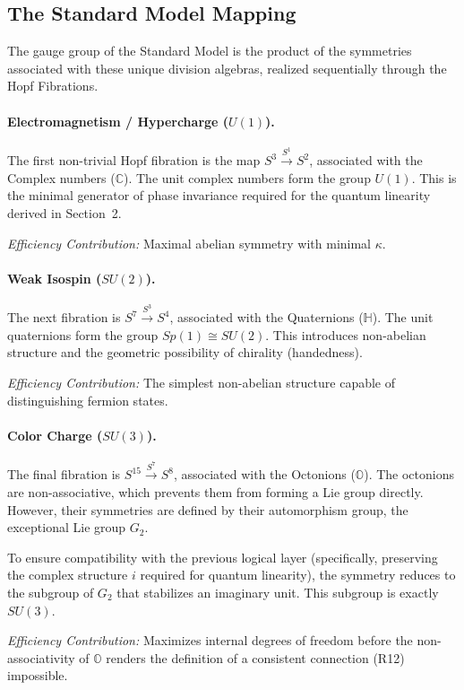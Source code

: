 \documentclass[12pt,a4paper]{article}
\theoremstyle{definition}
\newcommand{\C}{\mathbb{C}}
\newcommand{\HH}{\mathbb{H}}
\newcommand{\OO}{\mathbb{O}}
\newcommand{\kap}{\kappa}
\begin{document}
\subsection{The Standard Model Mapping}

The gauge group of the Standard Model is the product of the symmetries associated with these unique division algebras, realized sequentially through the Hopf Fibrations.

\paragraph{Electromagnetism / Hypercharge ($U(1)$).}
The first non-trivial Hopf fibration is the map $S^3 \xrightarrow{S^1} S^2$, associated with the Complex numbers ($\C$). The unit complex numbers form the group $U(1)$. This is the minimal generator of phase invariance required for the quantum linearity derived in Section~2.

\emph{Efficiency Contribution:} Maximal abelian symmetry with minimal $\kap$.

\paragraph{Weak Isospin ($SU(2)$).}
The next fibration is $S^7 \xrightarrow{S^3} S^4$, associated with the Quaternions ($\HH$). The unit quaternions form the group $Sp(1) \cong SU(2)$. This introduces non-abelian structure and the geometric possibility of chirality (handedness).

\emph{Efficiency Contribution:} The simplest non-abelian structure capable of distinguishing fermion states.

\paragraph{Color Charge ($SU(3)$).}
The final fibration is $S^{15} \xrightarrow{S^7} S^8$, associated with the Octonions ($\OO$). The octonions are non-associative, which prevents them from forming a Lie group directly. However, their symmetries are defined by their automorphism group, the exceptional Lie group $G_2$.

To ensure compatibility with the previous logical layer (specifically, preserving the complex structure $i$ required for quantum linearity), the symmetry reduces to the subgroup of $G_2$ that stabilizes an imaginary unit. This subgroup is exactly $SU(3)$.

\emph{Efficiency Contribution:} Maximizes internal degrees of freedom before the non-associativity of $\OO$ renders the definition of a consistent connection (R12) impossible.
\end{document}
